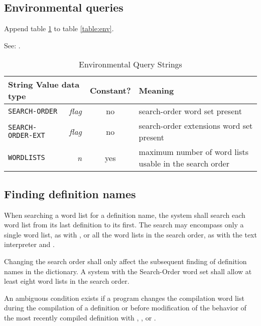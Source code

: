 \subsection{Environmental queries} %

Append table \ref{search:env} to table \ref{table:env}.

See: .

\begin{table}[ht]
  \begin{center}
	\caption{Environmental Query Strings}
	\label{search:env}
	\begin{tabular}{p{9em}rcp{}}
		\hline\hline
		\multicolumn{2}{l}{String \hfill Value data type} & Constant? & Meaning \\
		\hline
		\texttt{SEARCH-ORDER}		& \emph{flag}	& no	&
			search-order word set present \\
		\texttt{SEARCH-ORDER-EXT}	& \emph{flag}	& no	&
			search-order extensions word set present \\
		\texttt{WORDLISTS}			& \emph{n}		& yes	&
			maximum number of word lists usable in the search order\\
		\hline\hline
	\end{tabular}
  \end{center}
\end{table}

\subsection{Finding definition names} %
\label{search:find}

When searching a word list for a definition name, the system shall
search each word list from its last definition to its first. The
search may encompass only a single word list, as with
, or all the word lists in the search order,
as with the text interpreter and .

Changing the search order shall only affect the subsequent finding
of definition names in the dictionary. A system with the Search-Order
word set shall allow at least eight word lists in the search order.

An ambiguous condition exists if a program changes the compilation
word list during the compilation of a definition or before
modification of the behavior of the most recently compiled definition
with , , or
.

